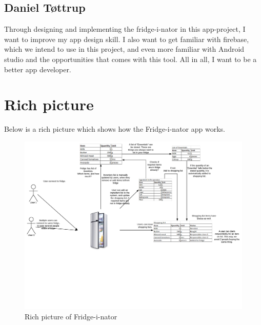 \documentclass[12pt]{article}
\begin{document}
\subsection{Daniel Tøttrup}
Through designing and implementing the fridge-i-nator in this app-project, I want to improve my app design skill. I also want to get familiar
with firebase, which we intend to use in this project, and even more familiar with
Android studio and the opportunities that comes with this tool. All in all, I want to be a better app developer.

\section{Rich picture}
Below is a rich picture which shows how the Fridge-i-nator app works.

\begin{figure}[H]
	\centering
	\includegraphics[width=180mm]{Img/Fridge_rich_picture.pdf}
	\caption{Rich picture of Fridge-i-nator}
	\label{fig:RichPic}
\end{figure}
\end{document}
